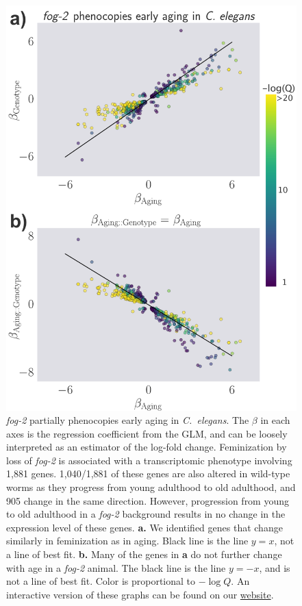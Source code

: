 \documentclass[10pt,letterpaper,twocolumn]{article}
\newcommand{\cel}{\emph{C.~elegans}}
\newcommand{\fog}{\emph{\mbox{fog-2}}}
\newcommand{\fogn}{1,881}
\newcommand{\coexpressed}{905}
\newcommand{\intersectn}{1,040}
\newcommand{\webref}{
\href{https://wormlabcaltech.github.io/Angeles_Leighton_2016/}{website}}
\begin{document}
\begin{figure}
\renewcommand{\familydefault}{\sfdefault}\normalfont{}
\centering
\includegraphics[width=\linewidth]{../output/figs/final_figs/aberrant_aging.pdf}
\caption{ \fog{} partially phenocopies early aging in \cel{}. The $\beta$ in each axes is the regression coefficient from the GLM, and can be loosely interpreted as an estimator of the log-fold change.
Feminization by loss of \fog{} is associated with a transcriptomic phenotype involving \fogn{} genes. \intersectn{}/\fogn{} of these genes are also altered in wild-type worms as they progress from young adulthood to old adulthood, and \coexpressed{} change in the same direction. However, progression from young to old adulthood in a \fog{} background results in no change in the expression level of these genes. \textbf{a.} We identified genes that change similarly in feminization as in aging. Black line is the line $y=x$, not a line of best fit. \textbf{b.} Many of the genes in \textbf{a} do not further change with age in a \fog{} animal.
The black line is the line $y=-x$, and is not a line of best fit. Color is proportional to $-\log{Q}$.
An interactive version of these graphs can be found on our \webref{}.
}%
\label{fig:aberrant_aging}
\end{figure}
\end{document}
